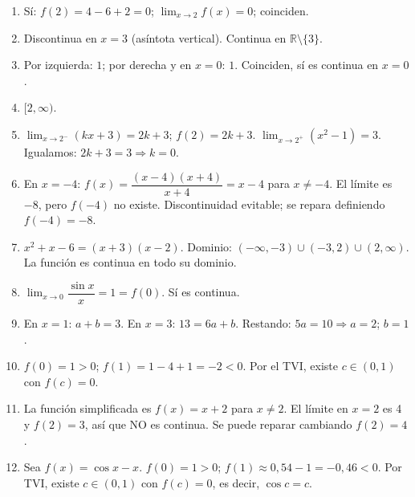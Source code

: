 \documentclass[12pt, letterpaper]{article}
\begin{document}
  \begin{enumerate}[resume=respuestas, leftmargin=*, label=\textbf{\arabic*.}]
    \item Sí: $f(2) = 4 - 6 + 2 = 0$; $\lim_{x \to 2} f(x) = 0$; coinciden.

    \item Discontinua en $x = 3$ (asíntota vertical). Continua en $\mathbb{R} \setminus \{3\}$.

    \item Por izquierda: $1$; por derecha y en $x = 0$: $1$. Coinciden, sí es continua en $x = 0$.

    \item $[2, \infty)$.

    \item $\lim_{x \to 2^-} (kx + 3) = 2k + 3$; $f(2) = 2k + 3$. $\lim_{x \to 2^+} (x^2 - 1) = 3$. Igualamos: $2k + 3 = 3 \Rightarrow k = 0$.

    \item En $x = -4$: $f(x) = \dfrac{(x - 4)(x + 4)}{x + 4} = x - 4$ para $x \neq -4$. El límite es $-8$, pero $f(-4)$ no existe. Discontinuidad evitable; se repara definiendo $f(-4) = -8$.

    \item $x^2 + x - 6 = (x + 3)(x - 2)$. Dominio: $(-\infty, -3) \cup (-3, 2) \cup (2, \infty)$. La función es continua en todo su dominio.

    \item $\lim_{x \to 0} \dfrac{\sin x}{x} = 1 = f(0)$. Sí es continua.

    \item En $x = 1$: $a + b = 3$. En $x = 3$: $13 = 6a + b$. Restando: $5a = 10 \Rightarrow a = 2$; $b = 1$.

    \item $f(0) = 1 > 0$; $f(1) = 1 - 4 + 1 = -2 < 0$. Por el TVI, existe $c \in (0, 1)$ con $f(c) = 0$.

    \item La función simplificada es $f(x) = x + 2$ para $x \neq 2$. El límite en $x = 2$ es 4 y $f(2) = 3$, así que NO es continua. Se puede reparar cambiando $f(2) = 4$.

    \item Sea $f(x) = \cos x - x$. $f(0) = 1 > 0$; $f(1) \approx 0{,}54 - 1 = -0{,}46 < 0$. Por TVI, existe $c \in (0, 1)$ con $f(c) = 0$, es decir, $\cos c = c$.
  \end{enumerate}


\end{document}
